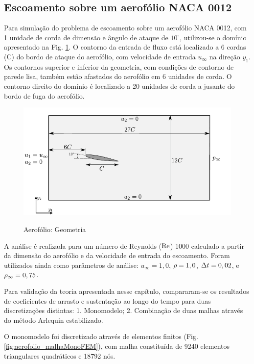 \documentclass[tese_patricia]{subfiles}
\begin{document}
\subsection{Escoamento sobre um aerofólio NACA 0012} \label{capitulo:Cap6:Exemplos:NACA0012}

Para simulação do problema de escoamento sobre um aerofólio NACA 0012, com 1 unidade de corda de dimensão e ângulo de ataque de $10^{\circ}$, utilizou-se o domínio apresentado na Fig. \ref{fig:aerofolio_geometria}. O contorno da entrada de fluxo está localizado a 6 cordas (C) do bordo de ataque do aerofólio, com velocidade de entrada $u_{\infty}$ na direção $y_1$. Os contornos superior e inferior da geometria, com condições de contorno de parede lisa, também estão afastados do aerofólio em 6 unidades de corda. O contorno direito do domínio é localizado a 20 unidades de corda a jusante do bordo de fuga do aerofólio. 

\begin{figure}[htb!]
	\centering 
	{\includegraphics[scale=1.0,trim=0cm 0cm 0cm 0cm, clip=true]{Imagens/Cap6/aerofolio_geometria.pdf}}	
	\caption{Aerofólio: Geometria}
	\label{fig:aerofolio_geometria}
\end{figure}

A análise é realizada para um número de Reynolds ($\mathrm{Re}$) 1000 calculado a partir da dimensão do aerofólio e da velocidade de entrada do escoamento. Foram utilizados ainda como parâmetros de análise: $u_{\infty} = 1,0$,  $\rho = 1,0$,  $\Delta t = 0,02$, e $\rho_\infty = 0,75$.

Para validação da teoria apresentada nesse capítulo, compararam-se os resultados de coeficientes de arrasto e sustentação ao longo do tempo para duas discretizações distintas: 1. Monomodelo; 2. Combinação de duas malhas através do método Arlequin estabilizado.

O monomodelo foi discretizado através de elementos finitos (Fig. \ref{fig:aerofolio_malhaMonoFEM}), com malha constituída de 9240 elementos triangulares quadráticos e 18792 nós. 
\end{document}
